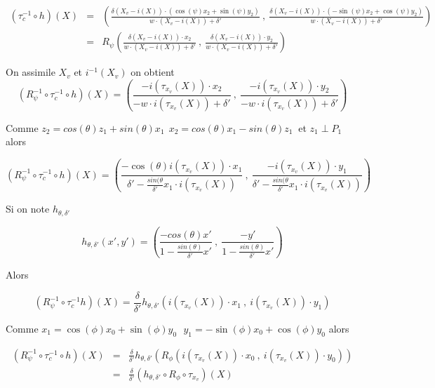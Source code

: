 \begin{eqnarray*}
(\tau_{c}^{-1} \circ h)(X) &=& \left(\frac{\delta (X_{v}-i(X))\cdot(\cos(\psi)x_{2}+\sin(\psi)y_{2}) }{w \cdot (X_{v}-i(X))+\delta'}~,~\frac{\delta (X_{v}-i(X))\cdot (-\sin(\psi)x_{2}+\cos(\psi)y_{2})}{w \cdot (X_{v}-i(X))+\delta'}  \right) \\
                                &=& R_{\psi}\left(\frac{\delta (X_{v}-i(X))\cdot x_{2} }{w \cdot (X_{v}-i(X))+\delta'}~,~\frac{\delta (X_{v}-i(X))\cdot y_{2}}{w \cdot (X_{v}-i(X))+\delta'}  \right) 
\end{eqnarray*}

On assimile $X_{v}$ et $i^{-1}(X_{v})$ on obtient 
\begin{equation*}
(R_{\psi}^{-1} \circ \tau_{c}^{-1}  \circ h)(X)=\left(\frac{-i(\tau_{x_{v}} (X))\cdot x_{2} }{-w \cdot i(\tau_{x_{v}} (X))+\delta'}~,~\frac{-i(\tau_{x_{v}} (X))\cdot y_{2}}{-w \cdot i(\tau_{x_{v}} (X))+\delta'}  \right) 
\end{equation*}

Comme $z_{2}=cos(\theta)z_{1}+sin(\theta)x_{1}~~x_{2}=cos(\theta)x_{1}-sin(\theta)z_{1}~$ et $z_{1}\perp P_{1}$ alors

\begin{equation*}
(R_{\psi}^{-1} \circ \tau_{c}^{-1}  \circ h)(X)=\left(\frac{-\cos(\theta)i(\tau_{x_{v}} (X))\cdot x_{1} }{\delta'-\frac{sin(\theta}{\delta'}x_{1}\cdot i(\tau_{x_{v}}(X))}~,~\frac{-i(\tau_{x_{v}} (X))\cdot y_{1}}{\delta'-\frac{sin(\theta}{\delta'}x_{1}\cdot i(\tau_{x_{v}}(X))}  \right) 
\end{equation*}

Si on note $h_{\theta,\delta'}$ 

\begin{equation*}
h_{\theta,\delta'}(x',y')=\left(\frac{-cos(\theta)x'}{1-\frac{sin(\theta)}{\delta'}x'} ~,~\frac{-y'}{1-\frac{sin(\theta)}{\delta'}x'}\right)
\end{equation*}

Alors 

\begin{equation*}
(R_{\psi}^{-1} \circ \tau_{c}^{-1} h)(X)= \frac{\delta}{\delta'}h_{\theta,\delta'}\left ( i(\tau_{x_{v}}(X)) \cdot x_{1}~,~ i(\tau_{x_{v}}(X)) \cdot y_{1}\right)
\end{equation*}

Comme $x_{1}=\cos(\phi)x_{0}+\sin(\phi)y_{0}~~~y_{1}=-\sin(\phi)x_{0}+\cos(\phi)y_{0}$ alors

\begin{eqnarray*}
(R_{\psi}^{-1} \circ \tau_{c}^{-1} \circ h)(X) &=& \frac{\delta}{\delta'}h_{\theta,\delta'}\left ( R_{\phi}(i(\tau_{x_{v}}(X)) \cdot x_{0}~,~ i(\tau_{x_{v}}(X)) \cdot y_{0})\right)\\
                                               &=&\frac{\delta}{\delta'} (h_{\theta,\delta'}\circ R_{\phi} \circ \tau_{x_{v}})(X)
\end{eqnarray*}

